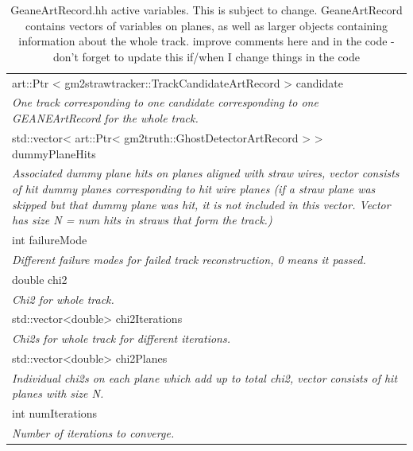 \documentclass{article}
\begin{document}
\begin{longtable}{|p{16cm}|}
\caption{GeaneArtRecord.hh active variables. This is subject to change. GeaneArtRecord contains vectors of variables on planes, as well as larger objects containing information about the whole track. improve comments here and in the code - don't forget to update this if/when I change things in the code} 

  \\ \hline

art::Ptr \textless{} gm2strawtracker::TrackCandidateArtRecord \textgreater{} candidate \\
\textit{One track corresponding to one candidate corresponding to one GEANEArtRecord for the whole track.} \\ \hline

std::vector\textless{} art::Ptr\textless{} gm2truth::GhostDetectorArtRecord \textgreater{} \textgreater{} dummyPlaneHits \\
\textit{Associated dummy plane hits on planes aligned with straw wires, vector consists of hit dummy planes corresponding to hit wire planes (if a straw plane was skipped but that dummy plane was hit, it is not included in this vector. Vector has size N = num hits in straws that form the track.)} \\ \hline

int failureMode \\ 
\textit{Different failure modes for failed track reconstruction, 0 means it passed.} \\ \hline

double chi2 \\ 
\textit{Chi2 for whole track.} \\ \hline

std::vector\textless{}double\textgreater{} chi2Iterations \\
\textit{Chi2s for whole track for different iterations.} \\ \hline

std::vector\textless{}double\textgreater{} chi2Planes \\
\textit{Individual chi2s on each plane which add up to total chi2, vector consists of hit planes with size N.} \\ \hline

int numIterations \\
\textit{Number of iterations to converge.} \\ \hline


\end{longtable}
\end{document}

